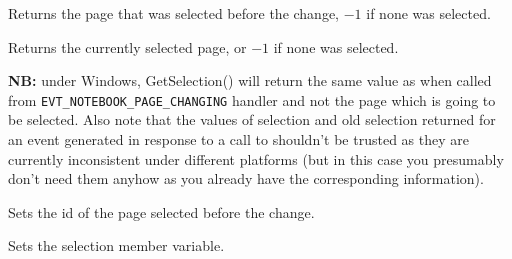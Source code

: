 
Returns the page that was selected before the change, $-1$ if none was selected.


\label{wxnotebookeventgetselection}


Returns the currently selected page, or $-1$ if none was selected.

{\bf NB:} under Windows, GetSelection() will return the same value as\rtfsp
{} when called from
{\tt EVT\_NOTEBOOK\_PAGE\_CHANGING} handler and not the page which is going to
be selected. Also note that the values of selection and old selection returned
for an event generated in response to a call to 
 shouldn't be trusted
as they are currently inconsistent under different platforms (but in this case
you presumably don't need them anyhow as you already have the corresponding
information).


\label{wxnotebookeventsetoldselection}


Sets the id of the page selected before the change.


\label{wxnotebookeventsetselection}


Sets the selection member variable.




